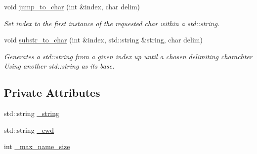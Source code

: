 \begin{Indent}
\begin{DoxyCompactItemize}
void \mbox{\hyperlink{class_parser_abc03a0e1dbb6886981f024cb3957b09a}{jump\+\_\+to\+\_\+char}} (int \&index, char delim)
\begin{DoxyCompactList}\small\item\em Set index to the first instance of the requested char within a std\+::string. \end{DoxyCompactList}\item 
void \mbox{\hyperlink{class_parser_a69c2ea3723b454b2627ecaf0fe7c88ea}{substr\+\_\+to\+\_\+char}} (int \&index, std\+::string \&string, char delim)
\begin{DoxyCompactList}\small\item\em Generates a std\+::string from a given index up until a chosen delimiting charachter Using another std\+::string as its base. \end{DoxyCompactList}\end{DoxyCompactItemize}
\end{Indent}
\subsection*{Private Attributes}
\begin{DoxyCompactItemize}
\item 
std\+::string \mbox{\hyperlink{class_parser_a172a2dcda0488c937d690755d9f4318c}{\+\_\+string}}
\item 
std\+::string \mbox{\hyperlink{class_parser_a3439fb839047252a9c701532ab5f15a0}{\+\_\+cwd}}
\item 
int \mbox{\hyperlink{class_parser_a77c955ec95d7c70515acae6d2e6ad88b}{\+\_\+max\+\_\+name\+\_\+size}}
\end{DoxyCompactItemize}
